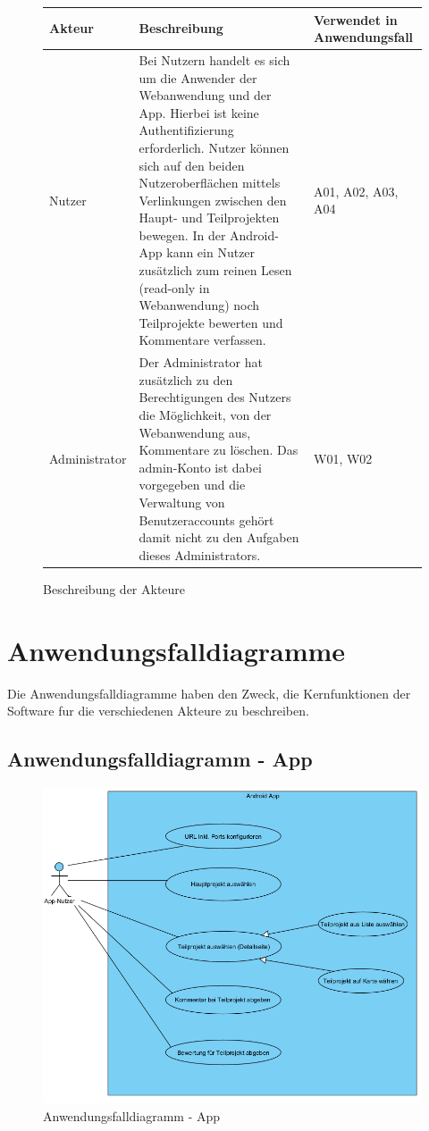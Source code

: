 \begin{figure}[h]
	\centering
	
	\begin{tabularx}{\textwidth}{ p{} | X | X }
		\textbf{Akteur} & \textbf{Beschreibung} & \textbf{Verwendet in Anwendungsfall} \\ \hline
		Nutzer & Bei Nutzern handelt es sich um die Anwender
 der Webanwendung und der App. Hierbei ist keine Authentifizierung erforderlich. Nutzer können sich auf
 den beiden Nutzeroberflächen mittels Verlinkungen zwischen den Haupt- und Teilprojekten bewegen.
 In der Android-App kann ein Nutzer zusätzlich zum reinen Lesen (read-only in Webanwendung) noch
 Teilprojekte bewerten und Kommentare verfassen. & A01, A02, A03, A04 \\ \hline
		Administrator & Der Administrator hat zusätzlich zu den Berechtigungen des Nutzers
 die Möglichkeit, von der Webanwendung aus, Kommentare zu löschen. Das admin-Konto ist dabei vorgegeben
 und die Verwaltung von Benutzeraccounts gehört damit nicht zu den Aufgaben dieses Administrators. & W01, W02
	\end{tabularx}

	
	\caption{Beschreibung der Akteure}
	\label{fig:akteur-tabelle}
\end{figure}


\newpage
\section{Anwendungsfalldiagramme}
Die Anwendungsfalldiagramme haben den Zweck, die Kernfunktionen der Software fur die verschiedenen Akteure zu beschreiben.
\subsection{Anwendungsfalldiagramm - App}

\begin{figure}[h]
	\centering
	\includegraphics[width=\textwidth]{img/usecaseandroid.png}		
	\caption{Anwendungsfalldiagramm - App}
	\label{fig:anwendungsfalldiagramm-app}
\end{figure}

